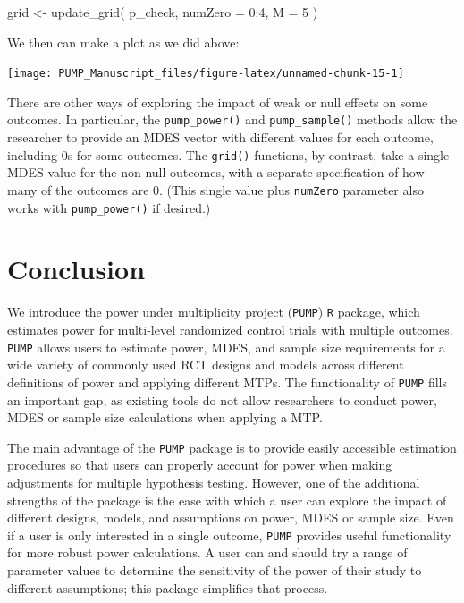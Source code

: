 \documentclass[
]{article}
\newenvironment{Shaded}{\begin{snugshade}}{\end{snugshade}}
\newcommand{\AttributeTok}[1]{\textcolor[rgb]{0.77,0.63,0.00}{#1}}
\newcommand{\DecValTok}[1]{\textcolor[rgb]{0.00,0.00,0.81}{#1}}
\newcommand{\FunctionTok}[1]{\textcolor[rgb]{0.00,0.00,0.00}{#1}}
\newcommand{\NormalTok}[1]{#1}
\newcommand{\OtherTok}[1]{\textcolor[rgb]{0.56,0.35,0.01}{#1}}
\newcommand{\SpecialCharTok}[1]{\textcolor[rgb]{0.00,0.00,0.00}{#1}}
\begin{document}
\begin{Shaded}
\begin{Highlighting}[]
\NormalTok{grid }\OtherTok{\textless{}{-}} \FunctionTok{update\_grid}\NormalTok{( p\_check,}
            \AttributeTok{numZero =} \DecValTok{0}\SpecialCharTok{:}\DecValTok{4}\NormalTok{,}
            \AttributeTok{M =} \DecValTok{5}\NormalTok{ )}
\end{Highlighting}
\end{Shaded}

We then can make a plot as we did above:

\begin{center}\texttt{[image: PUMP\_Manuscript\_files/figure-latex/unnamed-chunk-15-1]} \end{center}

There are other ways of exploring the impact of weak or null effects on
some outcomes. In particular, the \texttt{pump\_power()} and
\texttt{pump\_sample()} methods allow the researcher to provide an MDES
vector with different values for each outcome, including 0s for some
outcomes. The \texttt{grid()} functions, by contrast, take a single MDES
value for the non-null outcomes, with a separate specification of how
many of the outcomes are 0. (This single value plus \texttt{numZero}
parameter also works with \texttt{pump\_power()} if desired.)

\section{Conclusion}
\label{sec:conclusion}

We introduce the power under multiplicity project (\texttt{PUMP})
\texttt{R} package, which estimates power for multi-level randomized
control trials with multiple outcomes. \texttt{PUMP} allows users to
estimate power, MDES, and sample size requirements for a wide variety of
commonly used RCT designs and models across different definitions of
power and applying different MTPs. The functionality of \texttt{PUMP}
fills an important gap, as existing tools do not allow researchers to
conduct power, MDES or sample size calculations when applying a MTP.

The main advantage of the \texttt{PUMP} package is to provide easily
accessible estimation procedures so that users can properly account for
power when making adjustments for multiple hypothesis testing. However,
one of the additional strengths of the package is the ease with which a
user can explore the impact of different designs, models, and
assumptions on power, MDES or sample size. Even if a user is only
interested in a single outcome, \texttt{PUMP} provides useful
functionality for more robust power calculations. A user can and should
try a range of parameter values to determine the sensitivity of the
power of their study to different assumptions; this package simplifies
that process.
\end{document}
